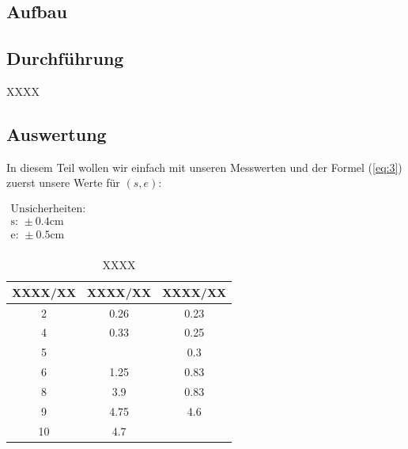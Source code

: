\documentclass[11pt,a4paper]{article}
\newcommand{\halftime}[4]{\begin{figure}[h]
\begin{minipage}{.#1\textwidth}#3\end{minipage}\begin{minipage}{.#2\textwidth}
\centering
#4\end{minipage}
\end{figure}}
\begin{document}
\subsection{Aufbau}



\subsection{Durchführung}

XXXX

\subsection{Auswertung}

In diesem Teil wollen wir einfach mit unseren Messwerten und der Formel (\ref{eq:3}) zuerst unsere Werte f\"ur $(s,e)$:

\begin{table}[h]
\centering
\caption{XXXX} \vspace{11pt}
$\begin{array}{l}
\textrm{Unsicherheiten:}\\
\textrm{s: } \pm 0.4 \textrm{cm}\\
\textrm{e: } \pm 0.5 \textrm{cm}\\
\end{array}$
\begin{tabular}{ccc}
\toprule
\textrm{XXXX}/\textrm{XX} & \textrm{XXXX}/\textrm{XX} & \textrm{XXXX}/\textrm{XX} \\
\midrule 
2 & 0.26 & 0.23\\
\hline
4 & 0.33 & 0.25\\
\hline 
5 & & 0.3\\
\hline 
6 & 1.25 & 0.83\\
\hline 
8 & 3.9 & 0.83\\ 
\hline
9 & 4.75 & 4.6\\ 
\hline
10 & 4.7 &\\ 
\bottomrule
\end{tabular}
\label{Tab:X}
\end{table}
\end{document}
